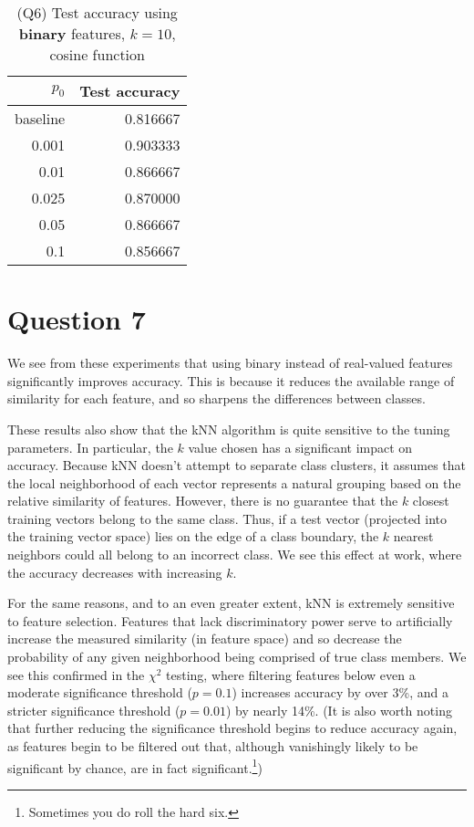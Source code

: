\documentclass[oneside,justified,marginals=raggedouter]{tufte-handout}
\begin{document}
\begin{table}
\begin{tabular}{@{}rr@{}}
\toprule
$p_0$ & Test accuracy \\ \midrule
baseline & 0.816667 \\
0.001    & 0.903333 \\
0.01     & 0.866667 \\
0.025    & 0.870000 \\
0.05     & 0.866667 \\
0.1      & 0.856667 \\
\bottomrule
\end{tabular}
\caption{(Q6) Test accuracy using {\bf binary} features, {\bf $k=10$},
cosine function}
\end{table}

\section{Question 7}

We see from these experiments that using binary instead of real-valued
features significantly improves accuracy. This is because it reduces the
available range of similarity for each feature, and so sharpens the differences
between classes.

These results also show that the kNN algorithm is quite sensitive to the
tuning parameters. In particular, the $k$ value chosen has a significant
impact on accuracy. Because kNN doesn't attempt to separate class clusters,
it assumes that the local neighborhood of each vector
represents a natural grouping based on the relative
similarity of features. However, there is no guarantee that the $k$ closest
training vectors belong to the same class. Thus, if a test vector (projected
into the training vector space) lies on the edge of a class boundary, the
$k$ nearest neighbors could all belong to an incorrect class. We see this
effect at work, where the accuracy decreases with increasing $k$.

For the same reasons, and to an even greater extent, kNN is extremely
sensitive to feature selection. Features that lack discriminatory power
serve to artificially increase the measured similarity (in feature space) and
so decrease the probability of any given neighborhood being comprised of
true class members. We see this confirmed in the $\chi^2$ testing, where
filtering features below even a moderate significance threshold ($p=0.1$)
increases accuracy by over 3\%, and a stricter significance threshold ($p=0.01$)
by nearly 14\%. (It is also worth noting that further reducing the significance
threshold begins to reduce accuracy again, as features begin to be filtered
out that, although vanishingly likely to be significant by chance, are in fact
significant.\footnote{Sometimes you do roll the hard six.})
\end{document}
